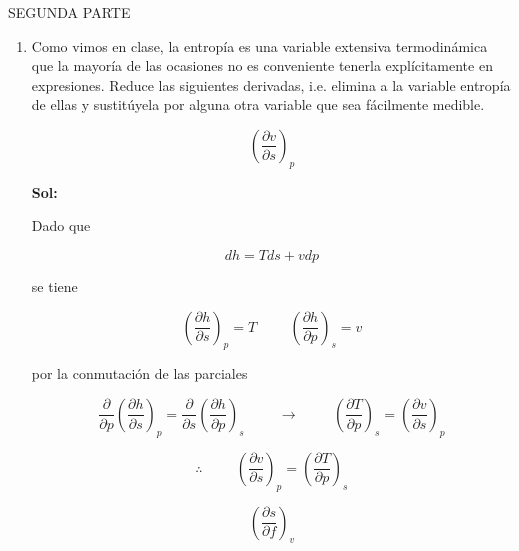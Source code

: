 \documentclass[12pt,a4paper]{article}
\begin{document}
SEGUNDA PARTE

\begin{enumerate}







\item Como vimos en clase, la entropía es una variable extensiva termodinámica que la mayoría de las ocasiones no es conveniente tenerla explícitamente en expresiones. Reduce las siguientes derivadas, i.e. elimina a la variable entropía de ellas y sustitúyela por alguna otra variable que sea fácilmente medible.

\begin{equation*}
    \left(\frac{\partial v}{ \partial s}\right)_{p}
\end{equation*}

\textbf{Sol:}

Dado que

\begin{equation}
    dh = T ds + vdp 
\end{equation}

se tiene

\begin{equation}
    \left(\frac{\partial h}{\partial s}\right)_{p} = T \hspace{1cm} \left(\frac{\partial h}{\partial p}\right)_{s} = v
\end{equation}

por la conmutación de las parciales

\begin{equation}
    \frac{\partial}{\partial p} \left(\frac{\partial h}{\partial s}\right)_{p} = \frac{\partial}{\partial s} \left(\frac{\partial h}{\partial p}\right)_{s} \hspace{1cm} \rightarrow \hspace{1cm} \left(\frac{\partial T}{\partial p}\right)_{s}  = \left(\frac{\partial v}{\partial s}\right)_{p} 
\end{equation}

\begin{equation*}
    \therefore \hspace{1cm} \left(\frac{\partial v}{ \partial s}\right)_{p} = \left(\frac{\partial T}{\partial p}\right)_{s}
\end{equation*}






\begin{equation*}
    \left(\frac{\partial s}{ \partial f}\right)_{v}
\end{equation*}


\end{enumerate}
\end{document}
